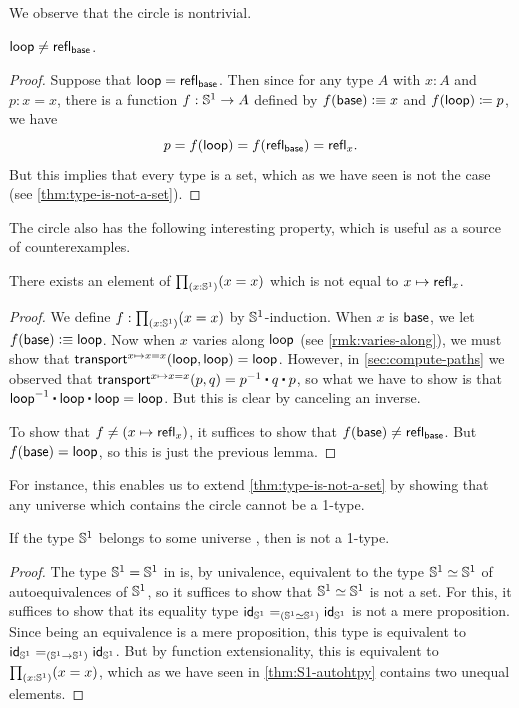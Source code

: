 We observe that the circle is nontrivial.

\begin{lem}\label{thm:loop-nontrivial}
  $\lloop\neq\refl{\base}$.
\end{lem}
\begin{proof}
  Suppose that $\lloop=\refl{\base}$.
  Then since for any type $A$ with $x:A$ and $p:x=x$, there is a function $f:\Sn^1\to A$ defined by $f(\base)\defeq x$ and $\ap f \lloop \defid p$, we have
  \[p = f(\lloop) = f(\refl{\base}) = \refl{x}.\]
  But this implies that every type is a set, which as we have seen is not the case (see \cref{thm:type-is-not-a-set}).
\end{proof}

The circle also has the following interesting property, which is useful as a source of counterexamples.

\begin{lem}\label{thm:S1-autohtpy}
  There exists an element of $\prd{x:\Sn^1} (x=x)$ which is not equal to $x\mapsto \refl{x}$.
\end{lem}
\begin{proof}
  We define $f:\prd{x:\Sn^1} (x=x)$ by $\Sn^1$-induction.
  When $x$ is $\base$, we let $f(\base)\defeq \lloop$.
  Now when $x$ varies along $\lloop$ (see \cref{rmk:varies-along}), we must show that $\transfib{x\mapsto x=x}{\lloop}{\lloop} = \lloop$.
  However, in \cref{sec:compute-paths} we observed that $\transfib{x\mapsto x=x}{p}{q} = \opp{p} \ct q \ct p$, so what we have to show is that $\opp{\lloop} \ct \lloop \ct \lloop = \lloop$.
  But this is clear by canceling an inverse.

  To show that $f\neq (x\mapsto \refl{x})$, it suffices to show that $f(\base) \neq \refl{\base}$.
  But $f(\base)=\lloop$, so this is just the previous lemma.
\end{proof}

For instance, this enables us to extend \cref{thm:type-is-not-a-set} by showing that any universe which contains the circle cannot be a 1-type.

\begin{cor}
  If the type $\Sn^1$ belongs to some universe \type, then \type is not a 1-type.
\end{cor}
\begin{proof}
  The type $\Sn^1=\Sn^1$ in \type is, by univalence, equivalent to the type $\eqv{\Sn^1}{\Sn^1}$ of auto\-equivalences of $\Sn^1$, so it suffices to show that $\eqv{\Sn^1}{\Sn^1}$ is not a set.
  For this, it suffices to show that its equality type $\id[(\eqv{\Sn^1}{\Sn^1})]{\idfunc[\Sn^1]}{\idfunc[\Sn^1]}$ is not a mere proposition.
  Since being an equivalence is a mere proposition, this type is equivalent to $\id[(\Sn^1\to\Sn^1)]{\idfunc[\Sn^1]}{\idfunc[\Sn^1]}$.
  But by function extensionality, this is equivalent to $\prd{x:\Sn^1} (x=x)$, which as we have seen in \cref{thm:S1-autohtpy} contains two unequal elements.
\end{proof}

